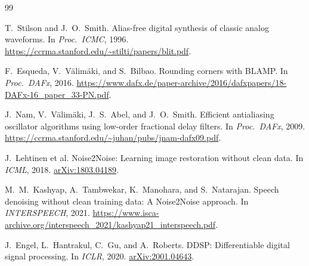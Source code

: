 \documentclass[10pt,twocolumn,letterpaper]{article}
\theoremstyle{remark}
\begin{document}














\appendix



\FloatBarrier
\raggedbottom
\balance
{\footnotesize
\setlength{\baselineskip}{11.5pt}
\begin{thebibliography}{99}
\setlength{\itemsep}{0.25ex plus 0.05ex}
\setlength{\parsep}{0pt}
\setlength{\parskip}{0pt}

T.~Stilson and J.~O.~Smith.
\newblock Alias-free digital synthesis of classic analog waveforms.
\newblock In \emph{Proc.\ ICMC}, 1996.
\newblock \url{https://ccrma.stanford.edu/~stilti/papers/blit.pdf}.

F.~Esqueda, V.~V\"alim\"aki, and S.~Bilbao.
\newblock Rounding corners with BLAMP.
\newblock In \emph{Proc.\ DAFx}, 2016.
\newblock \url{https://www.dafx.de/paper-archive/2016/dafxpapers/18-DAFx-16_paper_33-PN.pdf}.

J.~Nam, V.~V\"alim\"aki, J.~S.~Abel, and J.~O.~Smith.
\newblock Efficient antialiasing oscillator algorithms using low-order fractional delay filters.
\newblock In \emph{Proc.\ DAFx}, 2009.
\newblock \url{https://ccrma.stanford.edu/~juhan/pubs/jnam-dafx09.pdf}.

J.~Lehtinen et al.
\newblock Noise2Noise: Learning image restoration without clean data.
\newblock In \emph{ICML}, 2018.
\newblock \href{https://arxiv.org/abs/1803.04189}{arXiv:1803.04189}.

M.~M.~Kashyap, A.~Tambwekar, K.~Manohara, and S.~Natarajan.
\newblock Speech denoising without clean training data: A Noise2Noise approach.
\newblock In \emph{INTERSPEECH}, 2021.
\newblock \url{https://www.isca-archive.org/interspeech_2021/kashyap21_interspeech.pdf}.

J.~Engel, L.~Hantrakul, C.~Gu, and A.~Roberts.
\newblock DDSP: Differentiable digital signal processing.
\newblock In \emph{ICLR}, 2020.
\newblock \href{https://arxiv.org/abs/2001.04643}{arXiv:2001.04643}.


\end{thebibliography}}
\end{document}

